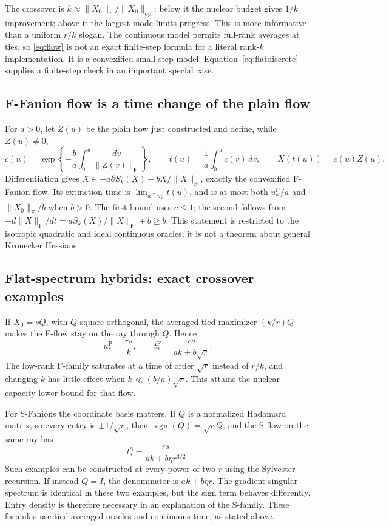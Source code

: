 \documentclass[11pt]{article}
\newcommand{\F}[1]{\lVert #1\rVert_{\mathrm F}}
\newcommand{\nuc}[1]{\lVert #1\rVert_*}
\newcommand{\op}[1]{\lVert #1\rVert_{\mathrm{op}}}
\newcommand{\sgn}{\operatorname{sign}}
\begin{document}
The crossover is $k\approx\nuc{X_0}/\op{X_0}$: below it the nuclear
budget gives $1/k$ improvement; above it the largest mode limits progress.
This is more informative than a uniform $r/k$ slogan. The continuous model
permits full-rank averages at ties, so \eqref{eq:flow} is not an exact
finite-step formula for a literal rank-$k$ implementation. It is a
convexified small-step model. Equation~\eqref{eq:flatdiscrete} supplies a
finite-step check in an important special case.

\subsection{F-Fanion flow is a time change of the plain flow}

For $a>0$, let $Z(u)$ be the plain flow just constructed and define, while
$Z(u)\ne0$,
\begin{equation}\label{eq:Ftimechange}
 c(u)=\exp\left\{-\frac ba\int_0^u\frac{dv}{\F{Z(v)}}\right\},\qquad
 t(u)=\frac1a\int_0^u c(v)\,dv,\qquad X(t(u))=c(u)Z(u).
\end{equation}
Differentiation gives
$\dot X\in-a\partial S_k(X)-bX/\F{X}$, exactly the convexified F-Fanion
flow. Its extinction time is $\lim_{u\uparrow u_*^{\mathrm{P}}}t(u)$, and is at
most both $u_*^{\mathrm{P}}/a$ and $\F{X_0}/b$ when $b>0$.
The first bound uses $c\leq1$; the second follows from
$-d\F{X}/dt=aS_k(X)/\F{X}+b\geq b$.
This statement is restricted to the isotropic quadratic and ideal continuous
oracles; it is not a theorem about general Kronecker Hessians.

\subsection{Flat-spectrum hybrids: exact crossover examples}

If $X_0=sQ$, with $Q$ square orthogonal, the averaged tied maximizer
$(k/r)Q$ makes the F-flow stay on the ray through $Q$. Hence
\begin{equation}\label{eq:hybridtimes}
 u_*^{\mathrm{P}}=\frac{rs}{k},\qquad
 t_*^{\mathrm{F}}=\frac{rs}{ak+b\sqrt r}.
\end{equation}
The low-rank F-family saturates at a time of order $\sqrt r$ instead of
$r/k$, and changing $k$ has little effect when $k\ll(b/a)\sqrt r$.
This attains the nuclear-capacity lower bound for that flow.

For S-Fanions the coordinate basis matters. If $Q$ is a normalized
Hadamard matrix, so every entry is $\pm1/\sqrt r$, then
$\sgn(Q)=\sqrt rQ$, and the S-flow on the same ray has
\begin{equation}\label{eq:Stime}
 t_*^{\mathrm{S}}=\frac{rs}{ak+b\eta r^{3/2}}.
\end{equation}
Such examples can be constructed at every power-of-two $r$ using the
Sylvester recursion. If instead $Q=I$, the denominator is
$ak+b\eta r$. The gradient singular spectrum is identical in these two
examples, but the sign term behaves differently. Entry density is therefore
necessary in an explanation of the S-family. These formulas use tied
averaged oracles and continuous time, as stated above.
\end{document}
